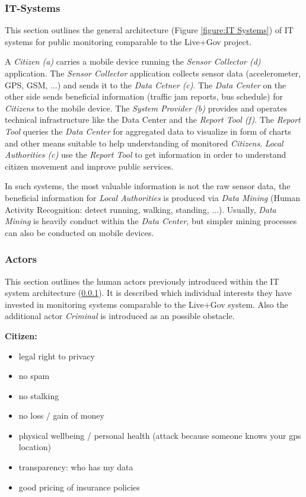 \subsubsection{IT-Systems}
\label{subsubsection:it-systems}

This section outlines the general architecture (Figure \ref{figure:IT Systems}) of IT systems for public monitoring comparable to the Live+Gov project.



A \textit{Citizen (a)} carries a mobile device running the \textit{Sensor Collector (d)} application.
The \textit{Sensor Collector} application collects sensor data (accelerometer, GPS, GSM, ...) and sends it to the \textit{Data Cetner (c)}. 
The \textit{Data Center} on the other side sends beneficial information (traffic jam reports, bus schedule) for \textit{Citizens} to the mobile device.
The \textit{System Provider (b)} provides and operates technical infrastructure like the Data Center and the \textit{Report Tool (f)}.
The \textit{Report Tool} queries the \textit{Data Center} for aggregated data to visualize in form of charts and other means suitable to help understanding of monitored \textit{Citizens}. 
\textit{Local Authorities (c)} use the \textit{Report Tool} to get information in order to understand citizen movement and improve public services. 

In such systems, the most valuable information is not the raw sensor data, the beneficial information for \textit{Local Authorities} is produced via \textit{Data Mining} (Human Activity Recognition: detect running, walking, standing, ...). 
Usually, \textit{Data Mining} is heavily conduct within the \textit{Data Center}, but simpler mining processes can also be conducted on mobile devices.



\subsubsection{Actors}
\label{subsubsection:humans}

This section outlines the human actors previously introduced within the IT system architecture (\ref{subsubsection:it-systems}).
It is described which individual interests they have invested in monitoring systems comparable to the Live+Gov system. 
Also the additional actor \textit{Criminal} is introduced as an possible obstacle.

\textbf{Citizen:}
\begin{itemize}
\item legal right to privacy
\item no spam
\item no stalking
\item no loss / gain of money
\item physical wellbeing / personal health (attack because someone knows your gps location)
\item transparency: who has my data
\item good pricing of insurance policies
\end{itemize}


